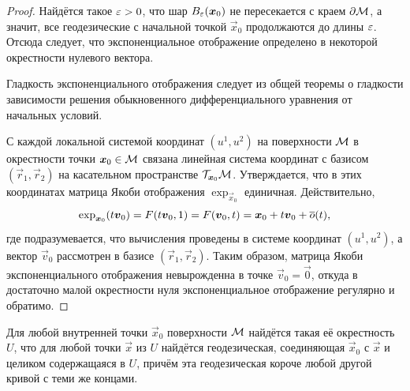 \begin{proof}
	Найдётся такое $\varepsilon > 0$, что шар $B_{\varepsilon}(\boldsymbol{x}_0)$ не пересекается с краем $\partial\mathcal{M}$, а значит, все геодезические с начальной точкой $\vec{x}_0$ продолжаются до длины $\varepsilon$. Отсюда следует, что экспоненциальное отображение определено в некоторой окрестности нулевого вектора.

	Гладкость экспоненциального отображения следует из общей теоремы о гладкости зависимости решения обыкновенного дифференциального уравнения от начальных условий.

	С каждой локальной системой координат $(u^1, u^2)$ на поверхности $\mathcal{M}$ в окрестности точки $\boldsymbol{x}_0 \in \mathcal{M}$ связана линейная система координат с базисом $(\vec{r}_1, \vec{r}_2)$ на касательном пространстве $\mathcal{T}_{\boldsymbol{x}_0}\mathcal{M}$. Утверждается, что в этих координатах матрица Якоби отображения $\exp_{\vec{x}_0}$ единичная. Действительно,
	\[
		\exp_{\boldsymbol{x}_0}(t\boldsymbol{v}_0) = F(t\boldsymbol{v}_0, 1) = F(\boldsymbol{v}_0, t) = \boldsymbol{x}_0 + t\boldsymbol{v}_0 + \overline{o}(t),
	\]
	где подразумевается, что вычисления проведены в системе координат $(u^1, u^2)$, а вектор $\vec{v}_0$ рассмотрен в базисе $(\vec{r}_1, \vec{r}_2)$. Таким образом, матрица Якоби экспоненциального отображения невырожденна в точке $\vec{v}_0 = \vec{0}$, откуда в достаточно малой окрестности нуля экспоненциальное отображение регулярно и обратимо.
\end{proof}

\begin{theorem} \label{theorem:Eexp}
	Для любой внутренней точки $\vec{x}_0$ поверхности $\mathcal{M}$ найдётся такая её окрестность $U$, что для любой точки $\vec{x}$ из $U$ найдётся геодезическая, соединяющая $\vec{x}_0$ с $\vec{x}$ и целиком содержащаяся в $U$, причём эта геодезическая короче любой другой кривой с теми же концами.
\end{theorem}

